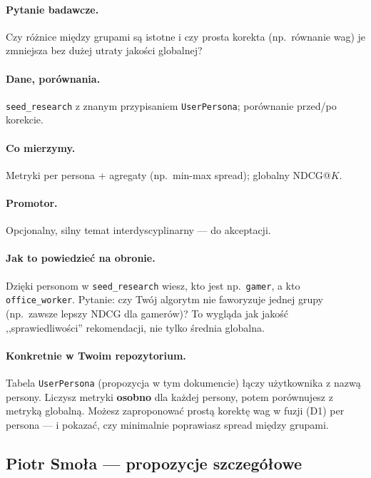 \documentclass[a4paper,11pt]{article}
\newcommand{\code}[1]{\texttt{\small #1}}
\begin{document}
\paragraph{Pytanie badawcze.}
Czy różnice między grupami są istotne i czy prosta korekta (np.\ równanie wag) je zmniejsza bez dużej utraty jakości globalnej?

\paragraph{Dane, porównania.}
\texttt{seed\_research} z znanym przypisaniem \code{UserPersona}; porównanie przed/po korekcie.

\paragraph{Co mierzymy.}
Metryki per persona + agregaty (np.\ min-max spread); globalny NDCG@$K$.

\paragraph{Promotor.}
Opcjonalny, silny temat interdyscyplinarny --- do akceptacji.

\paragraph{Jak to powiedzieć na obronie.}
Dzięki personom w \texttt{seed\_research} wiesz, kto jest np.\ \texttt{gamer}, a kto \texttt{office\_worker}. Pytanie: czy Twój algorytm nie faworyzuje jednej grupy (np.\ zawsze lepszy NDCG dla gamerów)? To wygląda jak jakość ,,sprawiedliwości'' rekomendacji, nie tylko średnia globalna.

\paragraph{Konkretnie w Twoim repozytorium.}
Tabela \code{UserPersona} (propozycja w tym dokumencie) łączy użytkownika z nazwą persony. Liczysz metryki \textbf{osobno} dla każdej persony, potem porównujesz z metryką globalną. Możesz zaproponować prostą korektę wag w fuzji (D1) per persona --- i pokazać, czy minimalnie poprawiasz spread między grupami.

\subsection{Piotr Smoła --- propozycje szczegółowe}
\end{document}
